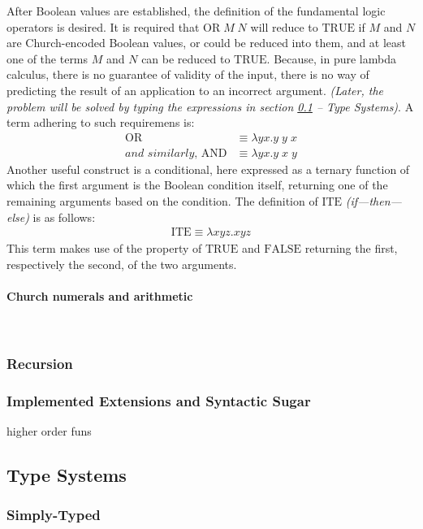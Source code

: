 \documentclass[a4paper,10pt]{article}
\begin{document}
After Boolean values are established, the definition of the fundamental
logic operators is desired. It is required that $\mathrm{OR}\;M\;N$ will
reduce to $\mathrm{TRUE}$ if $M$ and $N$ are Church-encoded Boolean values,
or could be reduced into them,
and at least one of the terms $M$ and $N$ can be reduced to $\mathrm{TRUE}$.
Because, in pure lambda calculus, there is no guarantee of validity of
the input, there is no way of predicting the result of an application to
an incorrect argument. \textit{(Later, the problem will be solved by typing
the expressions in section \ref{sec:types} -- Type Systems)}. A term adhering to
such requiremens is:
\begin{align*}
	\mathrm{OR} &\equiv \lambda y x. y\;y\;x\\
	\textit{and similarly, }\mathrm{AND} &\equiv \lambda y x. y\;x\;y
\end{align*}
Another useful construct is a conditional, here expressed as a ternary function
of which the first argument is the Boolean condition itself, returning one
of the remaining arguments based on the condition. The definition of
$\mathrm{ITE}$ \textit{(if---then---else)} is as follows:
\begin{align*}
	\mathrm{ITE} \equiv \lambda xyz.xyz
\end{align*}
This term makes use of the property of $\mathrm{TRUE}$ and $\mathrm{FALSE}$
returning the first, respectively the second, of the two arguments.

\paragraph{Church numerals and arithmetic}~\\ \label{encoding}


\subsubsection{Recursion}
\subsubsection{Implemented Extensions and Syntactic Sugar}

higher order funs

\subsection{Type Systems} \label{sec:types}
\subsubsection{Simply-Typed }
\end{document}
